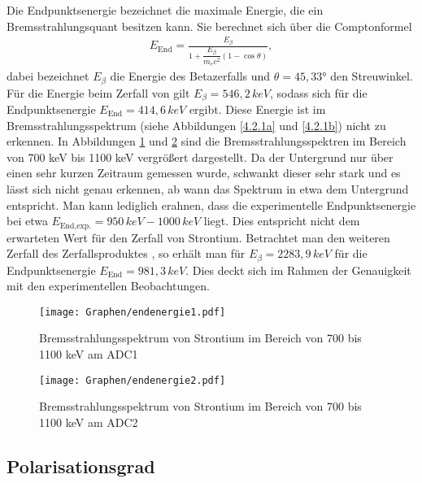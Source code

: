 \documentclass[twoside,colorback,accentcolor=tud4c,11pt]{tudreport}
\begin{document}
Die Endpunktsenergie bezeichnet die maximale Energie, die ein Bremsstrahlungsquant besitzen kann. Sie berechnet sich über die Comptonformel
\begin{align*}
E_{\text{End}}=\frac{E_{\beta}}{1+\dfrac{E_{\beta}}{m_ec^2}\left(1-\cos{\theta}\right)},
\end{align*}
dabei bezeichnet $E_{\beta}$ die Energie des Betazerfalls und $\theta=45,33$° den Streuwinkel. Für die Energie beim Zerfall von  gilt $E_{\beta}=546,2\,\si{keV}$, sodass sich für die Endpunktsenergie $E_{\text{End}}=414,6\,\si{keV}$ ergibt. Diese Energie ist im Bremsstrahlungsspektrum (siehe Abbildungen \ref{4.2.1a} und \ref{4.2.1b}) nicht zu erkennen. In Abbildungen \ref{4.2.1c} und \ref{4.2.1d} sind die Bremsstrahlungsspektren im Bereich von 700 keV bis 1100 keV vergrößert dargestellt. Da der Untergrund nur über einen sehr kurzen Zeitraum gemessen wurde, schwankt dieser sehr stark und es lässt sich nicht genau erkennen, ab wann das Spektrum in etwa dem Untergrund entspricht. Man kann lediglich erahnen, dass die experimentelle Endpunktsenergie bei etwa $E_{\text{End,exp.}}=950\,\si{keV} - 1000\,\si{keV}$ liegt. Dies entspricht nicht dem erwarteten Wert für den Zerfall von Strontium. Betrachtet man den weiteren Zerfall des Zerfallsproduktes , so erhält man für $E_{\beta}=2283,9\,\si{keV}$ für die Endpunktsenergie  $E_{\text{End}}=981,3\,\si{keV}$. Dies deckt sich im Rahmen der Genauigkeit mit den experimentellen Beobachtungen.
\begin{figure}[H]
\centering
   	\begin{minipage}[b]{1\textwidth}
   	\texttt{[image: Graphen/endenergie1.pdf]}
   	\caption{Bremsstrahlungsspektrum von Strontium im Bereich von 700 bis 1100 keV am ADC1}
  	\label{4.2.1c}
   	\end{minipage}
\end{figure}  
\begin{figure}[H]
\centering
   	\begin{minipage}[b]{1\textwidth}
   	\texttt{[image: Graphen/endenergie2.pdf]}
   	\caption{Bremsstrahlungsspektrum von Strontium im Bereich von 700 bis 1100 keV am ADC2}
  	\label{4.2.1d}
   	\end{minipage}
\end{figure}
\subsection{Polarisationsgrad}\label{subsec:polgrad}
\end{document}
